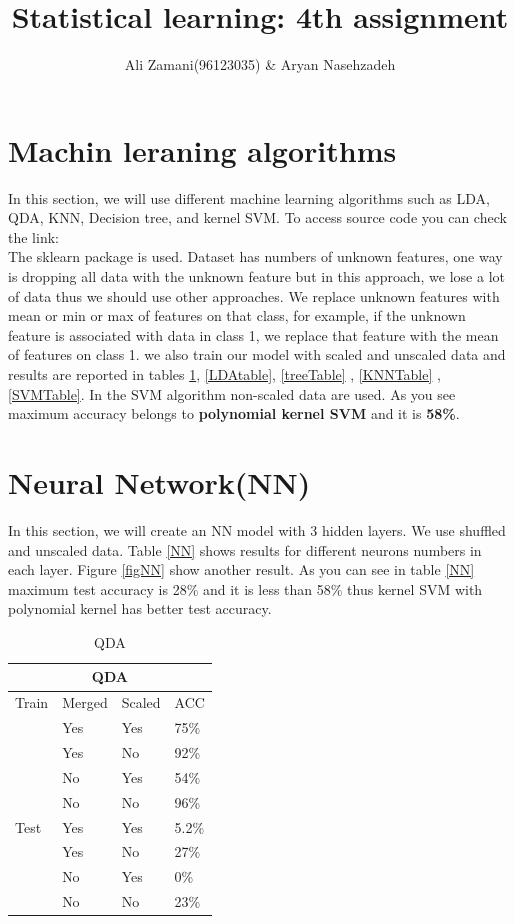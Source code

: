 \documentclass[17pt]{article}
\title{
	{\large Statistical learning: 4th assignment}\\}
\author{Ali Zamani(96123035) \& Aryan Nasehzadeh}
\begin{document}
\maketitle

\newpage
\section{Machin leraning algorithms}
In this section, we will use different machine learning algorithms such as LDA, QDA, KNN, Decision tree, and kernel SVM. To access source code you can check the link:\\
The sklearn package is used.
Dataset has numbers of unknown features, one way is dropping all data with the unknown feature but in this approach, we lose a lot of data thus we should use other approaches. 
We replace unknown features with mean or min or max of features on that class, for example, if the unknown feature is associated with data in class 1, we replace that feature with the mean of features on class 1. we also train our model with scaled and unscaled data and results are reported in tables \ref{QDATable}, \ref{LDAtable}, \ref{treeTable} , \ref{KNNTable} , \ref{SVMTable}. In the SVM algorithm non-scaled data are used. As you see maximum accuracy belongs to \textbf{polynomial kernel SVM} and it is \textbf{58\%}.
\section{Neural Network(NN)}
In this section, we will create an NN model with 3 hidden layers. We use shuffled and unscaled data. Table \ref{NN} shows results for different neurons numbers in each layer. Figure \ref{figNN} show another result. As you can see in table \ref{NN} maximum test accuracy is 28\% and it is less than 58\% thus kernel SVM with polynomial kernel has better test accuracy.
\newpage
\begin{table}[]
	\caption{QDA}
	\centering
	\label{QDATable}
	\begin{tabular}{|l|l|l|l|}
		\hline
		\multicolumn{4}{|c|}{QDA}\\
		\cline{1-4}
		\hline
		Train & Merged & Scaled & ACC \\
		\cline{2-4}
		 &    Yes      &   Yes    & 75\%  \\
		\cline{2-4}
		&    Yes      &   No     & 92\%\\
		\cline{2-4}
		& No & Yes &  54\%\\
		\cline{2-4}
		& No & No & 96\%\\
		\hline
		
		Test & Yes & Yes & 5.2\% \\
		\cline{2-4}
		&    Yes      &   No     & 27\%\\
		\cline{2-4}
		& No & Yes & 0\% \\
		\cline{2-4}
		& No & No & 23\%\\
		\hline
	\end{tabular}
\end{table}
\end{document}
